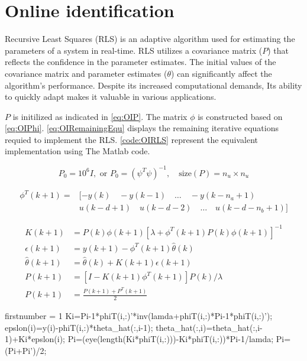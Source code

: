 \section{Online identification}
Recursive Least Squares (RLS) is an adaptive algorithm used for estimating the parameters of a system in real-time. RLS utilizes a covariance matrix ($P$) that reflects the confidence in the parameter estimates. The initial values of the covariance matrix and parameter estimates ($\theta$) can significantly affect the algorithm's performance. Despite its increased computational demands, Its ability to quickly adapt makes it valuable in various applications.

$P$ is initilized as indicated in \autoref{eq:OIP}. The matrix $\phi$ is constructed based on \autoref{eq:OIPhi}. \autoref{eq:OIRemainingEqu} displays the remaining iterative equations requied to implement the RLS. \autoref{code:OIRLS} represent the equivalent implementation using The Matlab code.

\begin{equation}
		P_0 = 10^6 I, \text{ or } P_0 = (\psi^T \psi)^{-1}, \quad \text{size}(P) = n_u \times n_u
	\label{eq:OIP}
\end{equation}

\begin{equation}
	\begin{aligned}
		\phi^T(k+1) = &[-y(k) \quad -y(k-1) \quad \dots \quad -y(k-n_a+1) \\
	& u(k-d+1) \quad u(k-d-2) \quad \dots \quad u(k-d-n_b+1)] 
\end{aligned}
	\label{eq:OIPhi}
\end{equation}

\begin{equation}
\begin{aligned}
	K(k+1) &= P(k)\phi(k+1) [\lambda + \phi^T(k+1) P(k) \phi(k+1)]^{-1} \\
	\epsilon(k+1) &= y(k+1) - \phi^T(k+1) \hat{\theta}(k) \\
	\hat{\theta}(k+1) &= \hat{\theta}(k) + K(k+1) \epsilon(k+1) \\
	P(k+1) &= [I - K(k+1) \phi^T(k+1)] P(k) / \lambda \\
	P(k+1) &= \frac{P(k+1) + P^T(k+1)}{2}
\end{aligned}
	\label{eq:OIRemainingEqu}
\end{equation}

\begin{code}
	\begin{matlabcode}{firstnumber = 1}
K{i}=P{i-1}*phiT(i,:)'*inv(lamda+phiT(i,:)*P{i-1}*phiT(i,:)');
epslon(i)=y(i)-phiT(i,:)*theta_hat(:,i-1);
theta_hat(:,i)=theta_hat(:,i-1)+K{i}*epslon(i);
P{i}=(eye(length(K{i}*phiT(i,:)))-K{i}*phiT(i,:))*P{i-1}/lamda;
P{i}=(P{i}+P{i}')/2;
	\end{matlabcode}
	\label{code:OIRLS}
\end{code}
 
